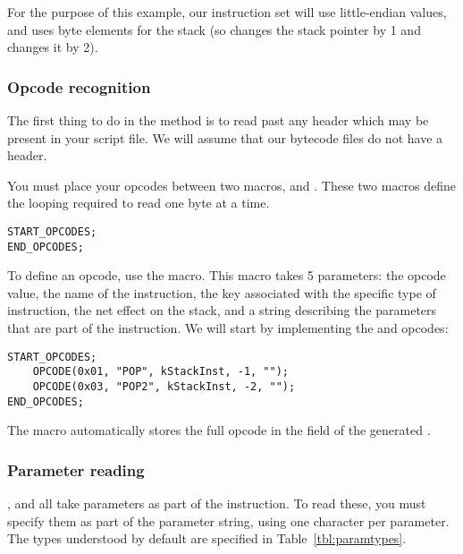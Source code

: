 For the purpose of this example, our instruction set will use little-endian values, and uses byte elements for the stack (so  changes the stack pointer by 1 and  changes it by 2).

\subsubsection{Opcode recognition}
The first thing to do in the  method is to read past any header which may be present in your script file. We will assume that our bytecode files do not have a header.

You must place your opcodes between two macros,  and . These two macros define the looping required to read one byte at a time.

\begin{C++}
\begin{lstlisting}
START_OPCODES;
END_OPCODES;
\end{lstlisting}
\end{C++}

To define an opcode, use the  macro. This macro takes 5 parameters: the opcode value, the name of the instruction, the key associated with the specific type of instruction, the net effect on the stack, and a string describing the parameters that are part of the instruction. We will start by implementing the  and  opcodes:

\begin{C++}
\begin{lstlisting}
START_OPCODES;
	OPCODE(0x01, "POP", kStackInst, -1, "");
	OPCODE(0x03, "POP2", kStackInst, -2, "");
END_OPCODES;
\end{lstlisting}
\end{C++}

The  macro automatically stores the full opcode in the  field of the generated .

\subsubsection{Parameter reading}
,  and  all take parameters as part of the instruction. To read these, you must specify them as part of the parameter string, using one character per parameter. The types understood by default are specified in Table~\vref{tbl:paramtypes}.


